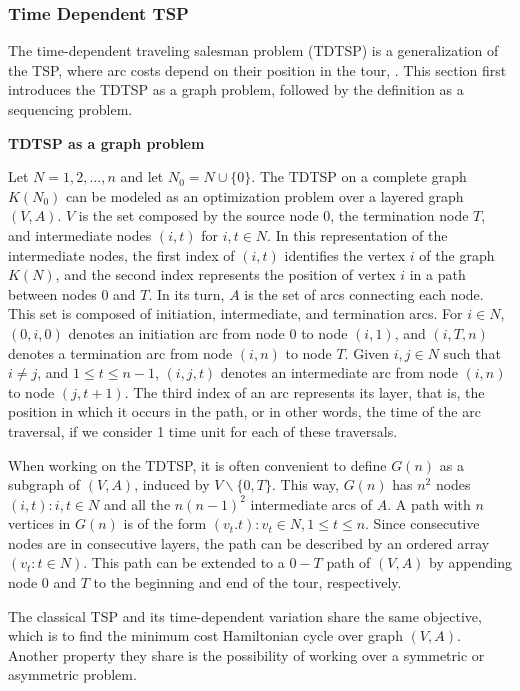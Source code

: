 \subsubsection{Time Dependent TSP}
\label{sec:time-dependent-tsp}

The time-dependent traveling salesman problem (TDTSP) is a generalization of the TSP, where arc costs depend on their position in the tour, \cite{time_dependent_tsp, tdtsp_single_machine}. This section first introduces the TDTSP as a graph problem, followed by the definition as a sequencing problem. 

\textbf{TDTSP as a graph problem}

Let $N = {1, 2, ..., n}$ and let $N_{0} = N \cup \{0\}$. The TDTSP on a complete graph $K(N_{0})$ can be modeled as an optimization problem over a layered graph $(V, A)$. $V$ is the set composed by the source node $0$, the termination node $T$, and intermediate nodes $(i, t)$ for $i, t \in N$. In this representation of the intermediate nodes, the first index of $(i, t)$ identifies the vertex $i$ of the graph $K(N)$, and the second index represents the position of vertex $i$ in a path between nodes $0$ and $T$. In its turn, $A$ is the set of arcs connecting each node. This set is composed of initiation, intermediate, and termination arcs. For $i \in N$, $(0, i, 0)$ denotes an initiation arc from node 0 to node $(i, 1)$, and $(i, T, n)$ denotes a termination arc from node $(i, n)$ to node $T$. Given $i, j \in N$ such that $i \neq j$, and $1 \leq t \leq n-1$, $(i,j,t)$ denotes an intermediate arc from node $(i,n)$ to node $(j, t+1)$. The third index of an arc represents its layer, that is, the position in which it occurs in the path, or in other words, the time of the arc traversal, if we consider 1 time unit for each of these traversals.

When working on the TDTSP, it is often convenient to define $G(n)$ as a subgraph of $(V, A)$, induced by $V\backslash\{0, T\}$. This way, $G(n)$ has $n^2$ nodes ${(i, t): i, t \in N}$ and all the $n(n-1)^2$ intermediate arcs of $A$. A path with $n$ vertices in $G(n)$ is of the form ${(v_{t}. t): v_{t} \in N, 1 \leq t \leq n}$. Since consecutive nodes are in consecutive layers, the path can be described by an ordered array $(v_{t}: t \in N)$. This path can be extended to a $0-T$ path of $(V,A)$ by appending node $0$ and $T$ to the beginning and end of the tour, respectively.

The classical TSP and its time-dependent variation share the same objective, which is to find the minimum cost Hamiltonian cycle over graph $(V, A)$. Another property they share is the possibility of working over a symmetric or asymmetric problem.


